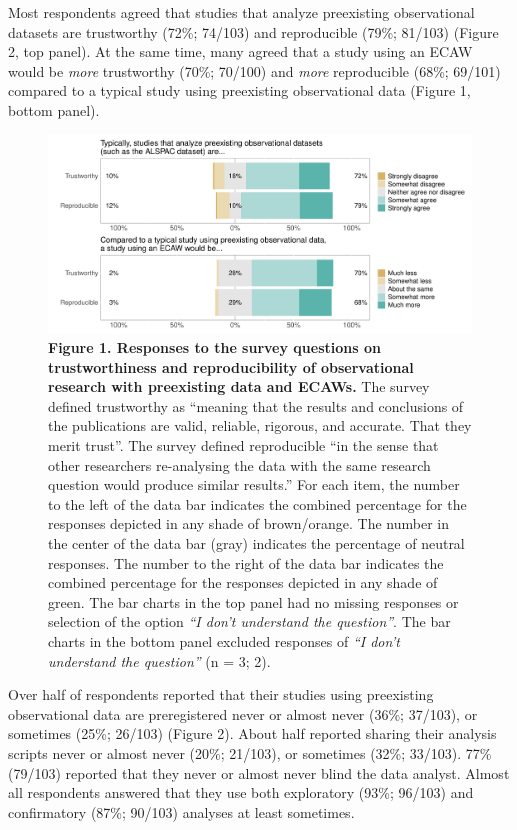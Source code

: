 \documentclass[
  man,floatsintext]{apa6}
\begin{document}
Most respondents agreed that studies that analyze preexisting observational datasets are trustworthy (72\%; 74/103) and reproducible (79\%; 81/103) (Figure 2, top panel). At the same time, many agreed that a study using an ECAW would be \emph{more} trustworthy (70\%; 70/100) and \emph{more} reproducible (68\%; 69/101) compared to a typical study using preexisting observational data (Figure 1, bottom panel).

\begin{figure}

{\centering \includegraphics[width=1\linewidth]{figs/typicallyEcawPlot-1} 

}

\caption{\textbf{Figure 1. Responses to the survey questions on trustworthiness and reproducibility of observational research with preexisting data and ECAWs.} The survey defined trustworthy as ``meaning that the results and conclusions of the publications are valid, reliable, rigorous, and accurate. That they merit trust''. The survey defined reproducible ``in the sense that other researchers re-analysing the data with the same research question would produce similar results.'' For each item, the number to the left of the data bar indicates the combined percentage for the responses depicted in any shade of brown/orange. The number in the center of the data bar (gray) indicates the percentage of neutral responses. The number to the right of the data bar indicates the combined percentage for the responses depicted in any shade of green. The bar charts in the top panel had no missing responses or selection of the option \emph{``I don't understand the question''}. The bar charts in the bottom panel excluded responses of \emph{``I don't understand the question''} (n = 3; 2).}\label{fig:typicallyEcawPlot}
\end{figure}



Over half of respondents reported that their studies using preexisting observational data are preregistered never or almost never (36\%; 37/103), or sometimes (25\%; 26/103) (Figure 2). About half reported sharing their analysis scripts never or almost never (20\%; 21/103), or sometimes (32\%; 33/103). 77\% (79/103) reported that they never or almost never blind the data analyst. Almost all respondents answered that they use both exploratory (93\%; 96/103) and confirmatory (87\%; 90/103) analyses at least sometimes.
\end{document}
